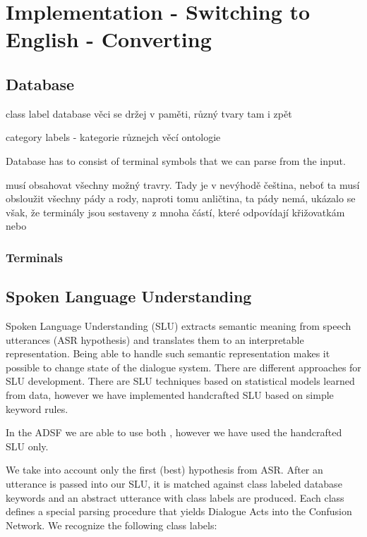\chapter{Implementation - Switching to English - Converting}

\section{Database}

class label database
věci se držej v paměti, různý tvary tam i zpět

category labels - kategorie různejch věcí
ontologie

Database has to consist of terminal symbols that we can parse from the input. 

musí obsahovat všechny možný travry. Tady je v nevýhodě čeština, neboť ta musí obsloužit všechny pády a rody, naproti tomu anličtina, ta pády nemá, ukázalo se však, že terminály jsou sestaveny z mnoha částí, které odpovídají křižovatkám nebo 

\subsection{Terminals}


\section{Spoken Language Understanding}

Spoken Language Understanding (SLU) extracts semantic meaning from speech utterances (ASR hypothesis) and translates them to an interpretable representation.
Being able to handle such semantic representation makes it possible to change state of the dialogue system.
There are different approaches for SLU development.
There are SLU techniques based on statistical models learned from data, however we have implemented handcrafted SLU based on simple keyword rules.  %

In the ADSF we are able to use both , however we have used the handcrafted SLU only.

We take into account only the first (best) hypothesis from ASR.
After an utterance is passed into our SLU, it is matched against class labeled database keywords and an abstract utterance with class labels are produced.
Each class defines a special parsing procedure that yields Dialogue Acts into the Confusion Network.
We recognize the following class labels:

